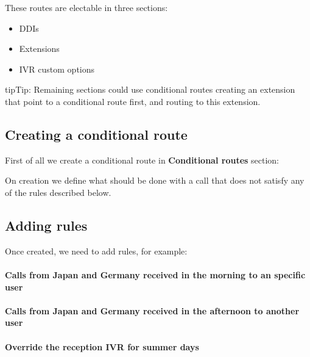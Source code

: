 \documentclass[letterpaper,10pt,english]{sphinxmanual}
\begin{document}
These routes are electable in three sections:
\begin{itemize}
\item {} 
DDIs

\item {} 
Extensions

\item {} 
IVR custom options

\end{itemize}

\begin{notice}{tip}{Tip:}
Remaining sections could use conditional routes creating an extension
that point to a conditional route first, and routing to this extension.
\end{notice}


\subsection{Creating a conditional route}
\label{company/conditional_routes:creating-a-conditional-route}
First of all we create a conditional route in \textbf{Conditional routes} section:

\noindent{}

On creation we define what should be done with a call that does not satisfy any
of the rules described below.


\subsection{Adding rules}
\label{company/conditional_routes:adding-rules}
Once created, we need to add rules, for example:
\paragraph{Calls from Japan and Germany received in the morning to an specific user}

\noindent{}
\paragraph{Calls from Japan and Germany received in the afternoon to another user}

\noindent{}
\paragraph{Override the reception IVR for summer days}
\end{document}
